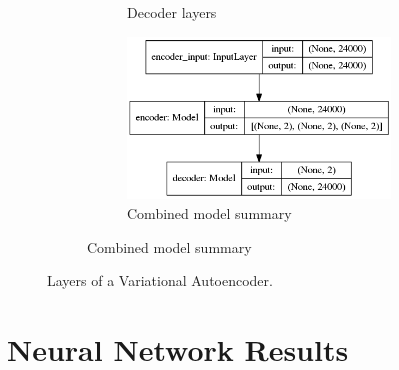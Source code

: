 \documentclass[a4paper]{article}
\begin{document}
\begin{figure}[h!]
\begin{subfigure}{.49\textwidth}
\begin{subfigure}{.6\textwidth}
			\caption{Decoder layers}
			\label{fig:vae_decoder}
		\end{subfigure}
		\begin{subfigure}{.8\textwidth}
			\centering
			\includegraphics[width=1\linewidth]{vae_mlp}
			\caption{Combined model summary}
			\label{fig:vae_mlp}
		\end{subfigure}
		\label{fig:decoder}
	\end{subfigure}
	
	\caption{Layers of a Variational Autoencoder.}
	\label{fig:vae}
\end{figure} 


\section{Neural Network Results} \label{results}




\end{document}
